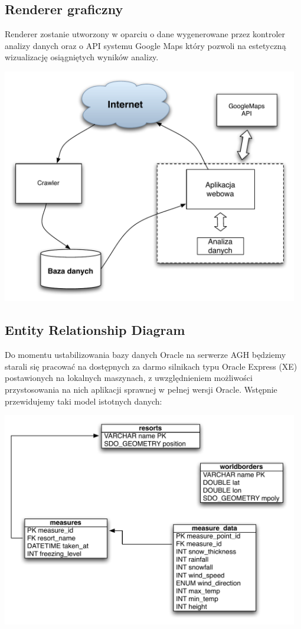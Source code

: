 \documentclass[12pt]{article}
\begin{document}
\subsection{Renderer graficzny}
Renderer zostanie utworzony w oparciu o dane wygenerowane przez kontroler
analizy danych oraz o API systemu Google Maps który pozwoli na estetyczną
wizualizację osiągniętych wyników analizy.

\includegraphics[width=35em]{images/data_flow_diagram.pdf}

\subsection{Entity Relationship Diagram}
Do momentu ustabilizowania bazy danych Oracle na serwerze AGH będziemy starali
się pracować na dostępnych za darmo silnikach typu Oracle Express (XE)
  postawionych na lokalnych maszynach, z uwzględnieniem możliwości
  przystosowania na nich aplikacji sprawnej w pełnej wersji Oracle. Wstępnie
  przewidujemy taki model istotnych danych:

\includegraphics[width=35em]{images/erd_diagram.pdf}
\end{document}
